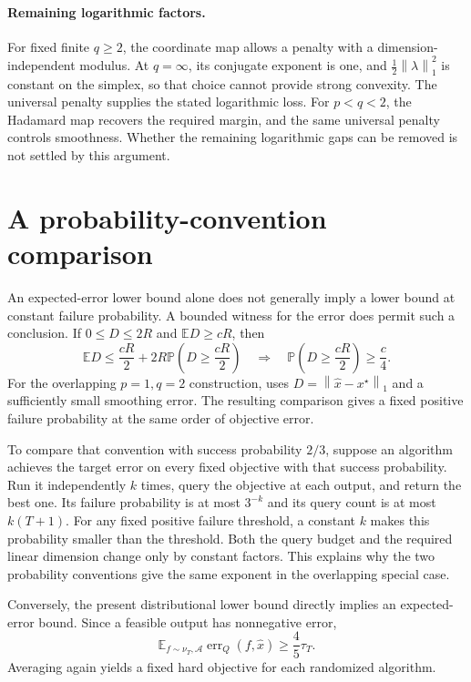 \documentclass[11pt,a4paper]{article}
\theoremstyle{definition}
\theoremstyle{remark}
\newcommand{\E}{\mathbb E}
\newcommand{\Prb}{\mathbb P}
\newcommand{\norm}[1]{\left\lVert #1\right\rVert}
\DeclareMathOperator{\err}{err}
\begin{document}
\paragraph{Remaining logarithmic factors.}
For fixed finite $q\ge2$, the coordinate map allows a penalty with a
dimension-independent modulus. At $q=\infty$, its conjugate exponent is one,
and $\tfrac12\norm{\lambda}_1^2$ is constant on the simplex, so that choice
cannot provide strong convexity. The universal penalty supplies the stated
logarithmic loss. For $p<q<2$, the Hadamard map recovers the required margin,
and the same universal penalty controls smoothness. Whether the remaining
logarithmic gaps can be removed is not settled by this argument.

\appendix
\section{A probability-convention comparison}\label{app:probability}

An expected-error lower bound alone does not generally imply a lower bound
at constant failure probability. A bounded witness for the error does permit
such a conclusion. If $0\le D\le2R$ and $\E D\ge cR$, then
\[
  \E D\le\frac{cR}{2}
         +2R\Prb\!\left(D\ge\frac{cR}{2}\right)
  \quad\Longrightarrow\quad
  \Prb\!\left(D\ge\frac{cR}{2}\right)\ge\frac c4.
\]
For the overlapping $p=1,q=2$ construction,
\cite[Sections D.5.2--D.5.3, in particular equation (38)]{LG26} uses
$D=\norm{\widehat x-x^\star}_1$ and a sufficiently small smoothing error.
The resulting comparison gives a fixed positive failure probability at the
same order of objective error.

To compare that convention with success probability $2/3$, suppose an
algorithm achieves the target error on every fixed objective with that
success probability. Run it independently $k$ times, query the objective
at each output, and return the best one. Its failure probability is at most
$3^{-k}$ and its query count is at most $k(T+1)$. For any fixed positive
failure threshold, a constant $k$ makes this probability smaller than the
threshold. Both the query budget and the required linear dimension change
only by constant factors. This explains why the two probability conventions
give the same exponent in the overlapping special case.

Conversely, the present distributional lower bound directly implies an
expected-error bound. Since a feasible output has nonnegative error,
\[
  \E_{f\sim\nu_T,\mathcal A}\err_Q(f,\widehat x)
       \ge\frac45\tau_T.
\]
Averaging again yields a fixed hard objective for each randomized algorithm.
\end{document}
